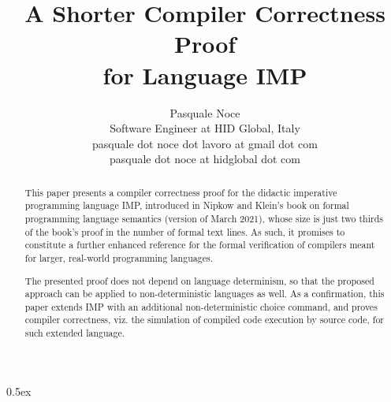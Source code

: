 \documentclass[11pt,a4paper,fleqn]{article}
\begin{document}
\title{A Shorter Compiler Correctness Proof\\for Language IMP}
\author{Pasquale Noce\\Software Engineer at HID Global, Italy\\pasquale dot noce dot lavoro at gmail dot com\\pasquale dot noce at hidglobal dot com}
\maketitle

\begin{abstract}
This paper presents a compiler correctness proof for the didactic imperative programming language
IMP, introduced in Nipkow and Klein's book on formal programming language semantics (version of
March 2021), whose size is just two thirds of the book's proof in the number of formal text lines.
As such, it promises to constitute a further enhanced reference for the formal verification of
compilers meant for larger, real-world programming languages.

The presented proof does not depend on language determinism, so that the proposed approach can be
applied to non-deterministic languages as well. As a confirmation, this paper extends IMP with an
additional non-deterministic choice command, and proves compiler correctness, viz. the simulation of
compiled code execution by source code, for such extended language.
\end{abstract}

\tableofcontents

\parindent 0pt\parskip 0.5ex





\end{document}
